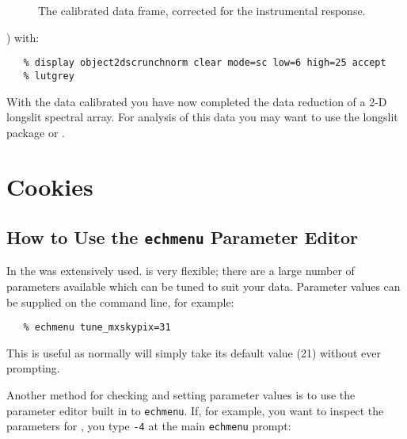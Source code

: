 {{\begin{figure}
\begin{center}
{\leavevmode\epsfysize=136mm}

\parbox{140mm}{
\caption{The calibrated data frame, corrected for the instrumental response.}
\label{finalcal}
}
\end{center}
\end{figure}
 ) with:  

{\scspec{\small}{ }
\begin{verbatim}
   % display object2dscrunchnorm clear mode=sc low=6 high=25 accept
   % lutgrey
\end{verbatim}
}


With the data calibrated you have now completed the data reduction of a 2-D longslit spectral array. For analysis of this data you may want to use the \cite{twodspec} {\sc longslit} package or \cite{dipso}.


\section{Cookies}

\subsection{How to Use the {\tt echmenu}
            Parameter Editor}

In the 
 was extensively used.
 is very flexible; there are a large number of
parameters available which can be tuned to suit your data.  Parameter
values can be supplied on the command line, for example:

{
\scspec{\small}{ }
\begin{verbatim}
   % echmenu tune_mxskypix=31
\end{verbatim}
}

This is useful as normally  will simply take its default
value (21) without ever prompting.

Another method for checking and setting parameter values is to use the
parameter editor built in to \verb+echmenu+\@.  If, for example, you want
to inspect the parameters for
,
you type \verb+-4+ at the main \verb+echmenu+ prompt:

}}
